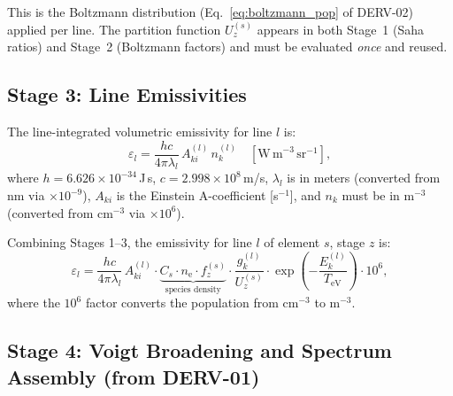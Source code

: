 \documentclass[11pt]{article}
\newcommand{\TeV}{T_\mathrm{eV}}
\newcommand{\ne}{n_\mathrm{e}}
\begin{document}
This is the Boltzmann distribution (Eq.~\eqref{eq:boltzmann_pop} of DERV-02)
applied per line. The partition function $U_z^{(s)}$ appears in both Stage~1
(Saha ratios) and Stage~2 (Boltzmann factors) and must be evaluated
\emph{once} and reused.

\subsection{Stage 3: Line Emissivities}
\label{sec:stage3}

The line-integrated volumetric emissivity for line $l$ is:
\begin{equation}
  \label{eq:emissivity}
  \varepsilon_l = \frac{hc}{4\pi\lambda_l}\,A_{ki}^{(l)}\,n_k^{(l)}
  \quad [\mathrm{W\,m}^{-3}\,\mathrm{sr}^{-1}],
\end{equation}
where $h = 6.626\times10^{-34}$\,J\,s, $c = 2.998\times10^8$\,m/s,
$\lambda_l$ is in meters (converted from nm via $\times 10^{-9}$),
$A_{ki}$ is the Einstein A-coefficient [s$^{-1}$], and $n_k$ must be
in m$^{-3}$ (converted from cm$^{-3}$ via $\times 10^6$).

Combining Stages 1--3, the emissivity for line $l$ of element $s$, stage $z$ is:
\begin{equation}
  \label{eq:emissivity-combined}
  \varepsilon_l = \frac{hc}{4\pi\lambda_l}\,A_{ki}^{(l)}
    \cdot \underbrace{C_s \cdot \ne \cdot f_z^{(s)}}_{\text{species density}}
    \cdot \frac{g_k^{(l)}}{U_z^{(s)}} \cdot \exp\!\left(-\frac{E_k^{(l)}}{\TeV}\right)
    \cdot 10^6,
\end{equation}
where the $10^6$ factor converts the population from cm$^{-3}$ to m$^{-3}$.


\subsection{Stage 4: Voigt Broadening and Spectrum Assembly (from DERV-01)}
\label{sec:stage4}
\end{document}
